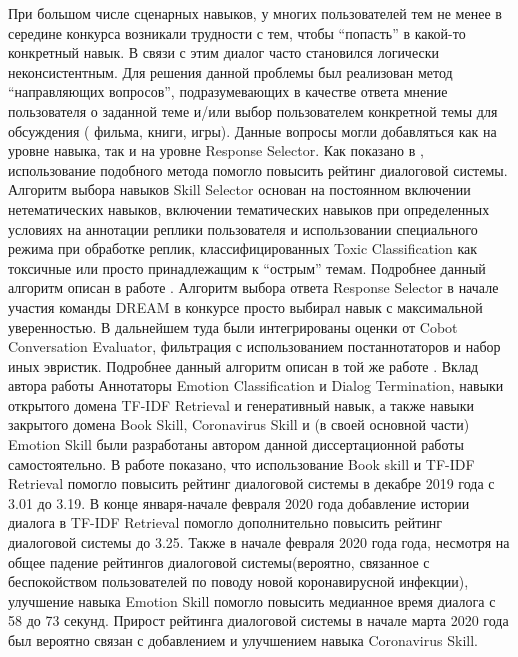 При большом числе сценарных навыков, у многих пользователей тем не менее в середине конкурса возникали трудности с тем, чтобы “попасть” в какой-то конкретный навык. В связи с этим диалог часто становился логически неконсистентным. Для решения данной проблемы был реализован метод “направляющих вопросов”, подразумевающих в качестве ответа мнение пользователя о заданной теме и/или выбор пользователем конкретной темы для обсуждения ( фильма, книги, игры). Данные вопросы могли добавляться как на уровне навыка, так и на уровне Response Selector. Как показано в \cite{Kuratov_Yusupov_Baymurzina_Kuznetsov_Cherniavskii_Dmitrievskiy_Ermakova_Ignatov_Karpov_Kornev_et al._2019, 2021}, использование подобного метода помогло повысить рейтинг диалоговой системы.
Алгоритм выбора навыков Skill Selector основан на постоянном включении нетематических навыков, включении тематических навыков при определенных условиях на аннотации реплики пользователя и использовании специального режима при обработке реплик, классифицированных Toxic Classification как токсичные или просто принадлежащим к “острым” темам. Подробнее данный алгоритм описан в работе \cite{Баймурзина_2021}.
Алгоритм выбора ответа Response Selector в начале участия команды DREAM в конкурсе просто выбирал навык с максимальной уверенностью. В дальнейшем туда были интегрированы оценки от Cobot Conversation Evaluator, фильтрация с использованием постаннотаторов и набор иных эвристик. Подробнее данный алгоритм описан в той же работе \cite{Баймурзина_2021}.
Вклад автора работы
Аннотаторы Emotion Classification и Dialog Termination, навыки открытого домена TF-IDF Retrieval и генеративный навык, а также навыки закрытого домена Book Skill, Coronavirus Skill и (в своей основной части) Emotion Skill были разработаны автором данной диссертационной работы самостоятельно.
В работе \cite{Kuratov_Yusupov_Baymurzina_Kuznetsov_Cherniavskii_Dmitrievskiy_Ermakova_Ignatov_Karpov_Kornev_et al._2019} показано, что использование Book skill и TF-IDF Retrieval помогло повысить рейтинг диалоговой системы в декабре 2019 года с 3.01 до 3.19.  В конце января-начале февраля 2020 года добавление истории диалога в TF-IDF Retrieval помогло дополнительно повысить рейтинг диалоговой системы до 3.25.  Также в начале февраля 2020 года года, несмотря на общее падение рейтингов диалоговой системы(вероятно, связанное  с беспокойством пользователей по поводу новой коронавирусной инфекции), улучшение навыка Emotion Skill помогло повысить медианное время диалога с 58 до 73 секунд. Прирост рейтинга диалоговой системы в начале марта 2020 года был вероятно связан с добавлением и улучшением навыка Coronavirus Skill.

